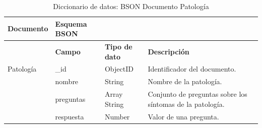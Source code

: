 \begin{table}[htpb]
\centering
\begin{tabularx}{\textwidth}{|l|X|X|X|X|}
\hline
\rowcolor[gray]{0.9}\textbf{Documento}         & \textbf{Esquema BSON} &              &                                                           \\ \hline
                  & \textbf{Campo}        & \textbf{Tipo de dato} & \textbf{Descripción                                              } \\ \hline
Patología         & \_id         & ObjectID     & Identificador del documento.                              \\ \hline
\multirow{3}{*}{} & nombre       & String       & Nombre de la patología.                                   \\ \cline{2-4} 
                  & preguntas    & Array String & Conjunto de preguntas sobre los síntomas de la patología. \\ \cline{2-4} 
                  & respuesta    & Number       & Valor de una pregunta.                                    \\ \hline
\end{tabularx}
\caption{Diccionario de datos: BSON Documento Patología}
\label{fig:dic_datos_BSON_3}
\end{table}

